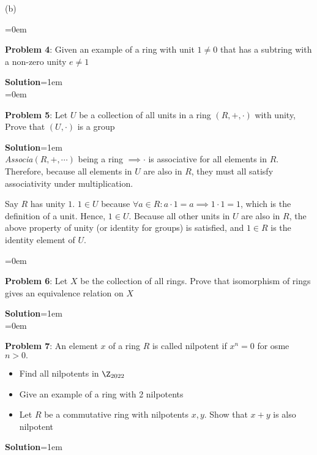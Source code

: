 \documentclass{article}
\begin{document}
(b) %

\newpage\parskip=0em
\begin{mdframed}[backgroundcolor=blue!20]
\textbf{Problem 4}: Given an example of a ring with unit $1 \neq 0$ that has a subtring with a non-zero unity $e \neq 1$
\end{mdframed}
\textbf{Solution}\parskip=1em\\

\newpage\parskip=0em
\begin{mdframed}[backgroundcolor=blue!20]
\textbf{Problem 5}: Let $U$ be a collection of all units in a ring $(R, + ,\cdot)$ with unity, Prove that $(U, \cdot)$ is a group
\end{mdframed}
\textbf{Solution}\parskip=1em\\

\emph{Associa}$(R, +, \cdots)$ being a ring $\implies \cdot$ is associative for all elements in $R$. Therefore, because all elements in $U$ are also in $R$, they must all satisfy associativity under multiplication.

Say $R$ has unity $1$. $1 \in U$ because $\forall a\in R: a\cdot 1 = a \implies 1 \cdot 1 = 1$, which is the definition of a unit. Hence, $1 \in U$. Because all other units in $U$ are also in $R$, the above property of unity (or identity for groups) is satisfied, and $1 \in R$ is the identity element of $U$. 



\newpage\parskip=0em
\begin{mdframed}[backgroundcolor=blue!20]
\textbf{Problem 6}: Let $X$ be the collection of all rings. Prove that isomorphism of rings gives an equivalence relation on $X$
\end{mdframed}
\textbf{Solution}\parskip=1em\\

\newpage\parskip=0em
\begin{mdframed}[backgroundcolor=blue!20]
\textbf{Problem 7}: An element $x$ of a ring $R$ is called nilpotent if $x^n = 0$ for osme $n>0.$
\begin{itemize}
    \item Find all nilpotents in $\Z_{2022}$
    \item Give an example of a ring with 2 nilpotents
    \item Let $R$ be a commutative ring with nilpotents $x, y$. Show that $x +y$ is also nilpotent
\end{itemize}
\end{mdframed}
\textbf{Solution}\parskip=1em\\
\end{document}
